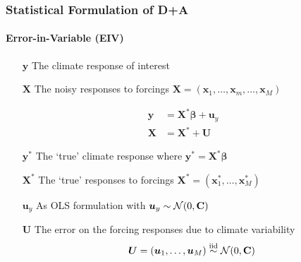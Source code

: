 \documentclass{beamer}
\newcommand{\C}{\ensuremath{\text{Cov}}}
\def\*#1{\bm{#1}}
\def\C{\textbf{\text{C}}}
\begin{document}
\begin{frame}
\frametitle{Statistical Formulation of D+A}
\framesubtitle{Error-in-Variable (EIV)}
\begin{itemize}
\item[$\*y$] The climate response of interest 
\item[$\*X$] The \alert{noisy} responses to forcings $\*X = (\*x_1, \dots, \*x_m , \dots, \*x_M)$
\end{itemize}

\begin{block}{}
\vspace*{-\baselineskip}\setlength\belowdisplayshortskip{0pt}
\begin{align*}
\*y &= \*X^* \*\beta + \*u_y \nonumber \\
\*X &= \*X^* + \*U \:
\end{align*}
\end{block}

\begin{itemize}
\item[$\*y^*$] The `true' climate response where $\*y^* = \*X^* \*\beta$
\item[$\*X^*$] The `true' responses to forcings $\*X^* = (\*x_1^*, \dots, \*x_M^*)$
\end{itemize}

\begin{itemize}
\item[$\*u_y$] As OLS formulation with $\*u_y \sim \mathcal N(0, \C)$
\item[$\*U$] The error on the forcing responses due to climate variability
\setlength\abovedisplayskip{0pt}
\setlength\belowdisplayskip{0pt}
\[
\*U = (\*u_1, \dots, \*u_M) \stackrel{\text{iid}}{\sim} \mathcal{N}(0,\C)
\]

\end{itemize}

\end{frame}
\end{document}
